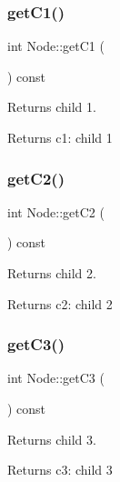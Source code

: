 \subsubsection{\texorpdfstring{get\+C1()}{getC1()}}
{\footnotesize\ttfamily int Node\+::get\+C1 (\begin{DoxyParamCaption}{ }\end{DoxyParamCaption}) const}



Returns child 1. 

\begin{DoxyReturn}{Returns}
c1\+: child 1 
\end{DoxyReturn}
\mbox{\label{classNode_aea950a9a2d050dc1aa571a5282c8b410}} 
\subsubsection{\texorpdfstring{get\+C2()}{getC2()}}
{\footnotesize\ttfamily int Node\+::get\+C2 (\begin{DoxyParamCaption}{ }\end{DoxyParamCaption}) const}



Returns child 2. 

\begin{DoxyReturn}{Returns}
c2\+: child 2 
\end{DoxyReturn}
\mbox{\label{classNode_a3b941af12dfb8085e4f621ed62469ba5}} 
\subsubsection{\texorpdfstring{get\+C3()}{getC3()}}
{\footnotesize\ttfamily int Node\+::get\+C3 (\begin{DoxyParamCaption}{ }\end{DoxyParamCaption}) const}



Returns child 3. 

\begin{DoxyReturn}{Returns}
c3\+: child 3 
\end{DoxyReturn}
\mbox{\label{classNode_aee9637a69c736a265a607f47ca2878d9}} 
